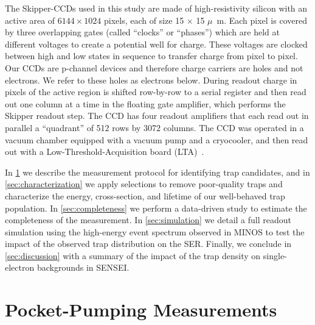 \documentclass[aps, prapplied,twocolumn,showpacs,superscriptaddress,preprintnumbers, longbibliography,nofootinbib,floatfix]{revtex4-2}
\begin{document}
The Skipper-CCDs used in this study are made of high-resistivity silicon with an active area of $6144\times1024$ pixels, each of size 15 $\times$ 15 $\mu$~m. 
Each pixel is covered by three overlapping gates (called ``clocks'' or ``phases'') which are held at different voltages to create a potential well for charge. 
These voltages are clocked between high and low states in sequence to transfer charge from pixel to pixel. 
Our CCDs are p-channel devices and therefore charge carriers are holes and not electrons. 
We refer to these holes as electrons below. 
During readout charge in pixels of the active region is shifted row-by-row to a serial register and then read out one column at a time in the floating gate amplifier, which performs the Skipper readout step. 
The CCD has four readout amplifiers that each read out in parallel a ``quadrant'' of 512 rows by 3072 columns. 
The CCD was operated in a vacuum chamber equipped with a vacuum pump and a cryocooler, and then read out with a Low-Threshold-Acquisition board (LTA)~\cite{LTA}.

In \cref{sec:identification} we describe the measurement protocol for identifying trap candidates, and in \cref{sec:characterization} we apply selections to remove poor-quality traps and characterize the energy, cross-section, and lifetime of our well-behaved trap population. 
In \cref{sec:completeness} we perform a data-driven study to estimate the completeness of the measurement. 
In \cref{sec:simulation} we detail a full readout simulation using the high-energy event spectrum observed in MINOS to test the impact of the observed trap distribution on the SER. 
Finally, we conclude in \cref{sec:discussion} with a summary of the impact of the trap density on single-electron backgrounds in SENSEI.


\section{Pocket-Pumping Measurements}
\label{sec:identification}
\end{document}

